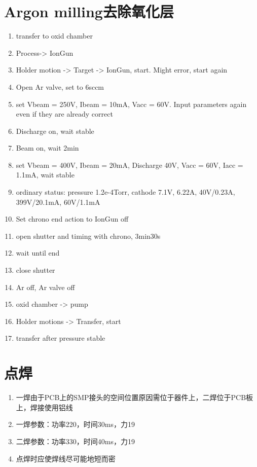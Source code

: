 \section{Argon milling去除氧化层} %
\label{sec:argon_milling去除氧化层}


\begin{enumerate}
    \item transfer to oxid chamber
    \item Process-> IonGun
    \item Holder motion -> Target -> IonGun, start. Might error, start again
    \item Open Ar valve, set to 6sccm
    \item set Vbeam = 250V, Ibeam = 10mA, Vacc = 60V. Input parameters again even if they are already correct
    \item Discharge on, wait stable
    \item Beam on, wait 2min
    \item set Vbeam = 400V, Ibeam = 20mA, Discharge 40V, Vacc = 60V, Iacc = 1.1mA, wait stable
    \item ordinary status: pressure 1.2e-4Torr, cathode 7.1V, 6.22A, 40V/0.23A, 399V/20.1mA, 60V/1.1mA
    \item Set chrono end action to IonGun off
    \item open shutter and timing with chrono, 3min30s
    \item wait until end
    \item close shutter
    \item Ar off, Ar valve off
    \item oxid chamber -> pump
    \item Holder motions -> Transfer, start
    \item transfer after pressure stable
\end{enumerate}


\section{点焊} %
\label{sec:点焊}
    \begin{enumerate}
        \item 一焊由于PCB上的SMP接头的空间位置原因需位于器件上，二焊位于PCB板上，焊接使用铝线
        \item 一焊参数：功率220，时间30ms，力19
        \item 二焊参数：功率330，时间40ms，力19
        \item 点焊时应使焊线尽可能地短而密
    \end{enumerate}
  

















